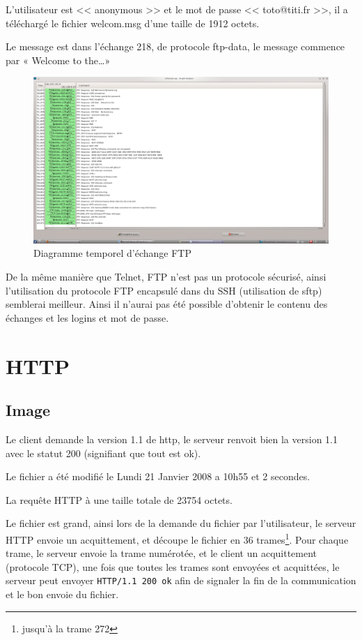 \documentclass[12pt,a4paper,openany]{article}
\begin{document}
	L'utilisateur est << anonymous >> et le mot de passe << toto@titi.fr >>, il a téléchargé le fichier welcom.msg d'une taille de 1912 octets.
	
	Le message est dans l'échange 218, de protocole ftp-data, le message commence par « Welcome to the\ldots » 

	\begin{figure}[H]
		\centering
		\includegraphics[width=13cm]{Capture6.jpeg}
		\caption{Diagramme temporel d'échange FTP}
		\label{fig:kernel}
	\end{figure}

	\begin{remarque}
		De la même manière que Telnet, FTP n'est pas un protocole sécurisé, ainsi l'utilisation du protocole FTP encapsulé dans du SSH (utilisation de
		sftp) semblerai meilleur. Ainsi il n'aurai pas été possible d'obtenir le contenu des échanges et les logins et mot de passe.
	\end{remarque}

	\section{HTTP}
	\subsection{Image}
	Le client demande la version 1.1 de http, le serveur renvoit bien la version 1.1 avec le statut 200 (signifiant que tout est ok).

	Le fichier a été modifié le Lundi 21 Janvier 2008 a 10h55 et 2 secondes.

	La requête HTTP à une taille totale de 23754 octets.

	Le fichier est grand, ainsi lors de la demande du fichier par l'utilisateur, le serveur HTTP envoie un acquittement, et découpe le fichier en 36
	trames\footnote{jusqu'à la trame 272}. Pour chaque trame, le serveur envoie la trame numérotée, et le client un acquittement (protocole TCP), une
	fois que toutes les trames sont envoyées et acquittées, le serveur peut envoyer \texttt{HTTP/1.1 200 ok} afin de signaler la fin de la
	communication et le bon envoie du fichier.
\end{document}
